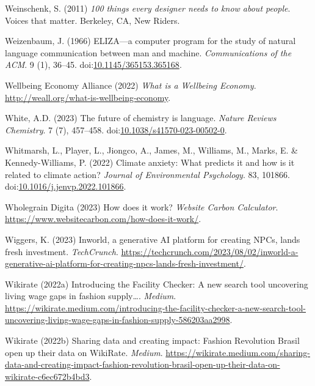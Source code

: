 \documentclass[
  letterpaper,
  DIV=11,
  numbers=noendperiod]{scrartcl}
\newlength{\cslhangindent}
\newenvironment{CSLReferences}[2] %
 {\begin{list}{}{%
  \setlength{\itemindent}{0pt}
  \setlength{\leftmargin}{0pt}
  \setlength{\parsep}{0pt}
  \ifodd #1
   \setlength{\leftmargin}{\cslhangindent}
   \setlength{\itemindent}{-1\cslhangindent}
  \fi
  \setlength{\itemsep}{#2\baselineskip}}}
 {\end{list}}
\begin{document}
\begin{CSLReferences}{0}{1}
Weinschenk, S. (2011) \emph{100 things every designer needs to know
about people}. Voices that matter. Berkeley, CA, New Riders.

Weizenbaum, J. (1966) {ELIZA}---a computer program for the study of
natural language communication between man and machine.
\emph{Communications of the ACM}. 9 (1), 36--45.
doi:\href{https://doi.org/10.1145/365153.365168}{10.1145/365153.365168}.

Wellbeing Economy Alliance (2022) \emph{What is a {Wellbeing Economy}}.
\url{http://weall.org/what-is-wellbeing-economy}.

White, A.D. (2023) The future of chemistry is language. \emph{Nature
Reviews Chemistry}. 7 (7), 457--458.
doi:\href{https://doi.org/10.1038/s41570-023-00502-0}{10.1038/s41570-023-00502-0}.

Whitmarsh, L., Player, L., Jiongco, A., James, M., Williams, M., Marks,
E. \& Kennedy-Williams, P. (2022) Climate anxiety: {What} predicts it
and how is it related to climate action? \emph{Journal of Environmental
Psychology}. 83, 101866.
doi:\href{https://doi.org/10.1016/j.jenvp.2022.101866}{10.1016/j.jenvp.2022.101866}.

Wholegrain Digita (2023) How does it work? \emph{Website Carbon
Calculator}. \url{https://www.websitecarbon.com/how-does-it-work/}.

Wiggers, K. (2023) Inworld, a generative {AI} platform for creating
{NPCs}, lands fresh investment. \emph{TechCrunch}.
\url{https://techcrunch.com/2023/08/02/inworld-a-generative-ai-platform-for-creating-npcs-lands-fresh-investment/}.

Wikirate (2022a) Introducing the {Facility Checker}: {A} new search tool
uncovering living wage gaps in fashion supply{\ldots{}}. \emph{Medium}.
\url{https://wikirate.medium.com/introducing-the-facility-checker-a-new-search-tool-uncovering-living-wage-gaps-in-fashion-supply-586203aa2998}.

Wikirate (2022b) Sharing data and creating impact: {Fashion Revolution
Brasil} open up their data on {WikiRate}. \emph{Medium}.
\url{https://wikirate.medium.com/sharing-data-and-creating-impact-fashion-revolution-brasil-open-up-their-data-on-wikirate-c6ec672b4bd3}.


\end{CSLReferences}
\end{document}
